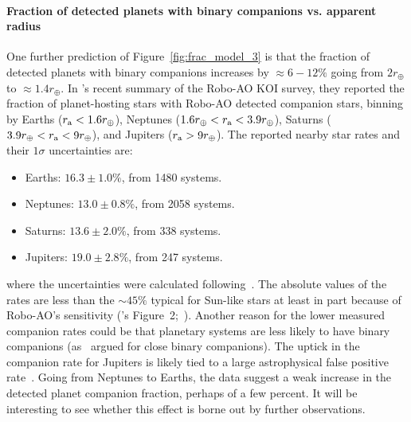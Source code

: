 \documentclass[12pt,modern]{aastex61}
\renewcommand{\a}{_{\rm a}}
\begin{document}
\paragraph{Fraction of detected planets with binary companions vs. apparent 
radius}
One further prediction of Figure~\ref{fig:frac_model_3} is that the
fraction of detected planets with binary companions increases by
$\approx 6-12\%$ going from $2r_\oplus$ to $\approx\! 1.4r_\oplus$.
In \citet{ziegler_robo-ao_2017}'s recent summary of the Robo-AO KOI
survey, they reported the fraction of planet-hosting stars with
Robo-AO detected companion stars, binning by Earths ($r\a <
1.6r_\oplus$), Neptunes ($1.6r_\oplus < r\a < 3.9 r_\oplus$), Saturns
($3.9r_\oplus < r\a < 9 r_\oplus$), and Jupiters ($r\a > 9r_\oplus$).
The reported nearby star rates and their $1\sigma$ uncertainties are:
\begin{itemize}
    \item Earths: $16.3 \pm 1.0\%$, from 1480 systems.
    \item Neptunes: $13.0 \pm 0.8\%$, from 2058 systems.
    \item Saturns: $13.6 \pm 2.0\%$, from 338 systems.
    \item Jupiters: $19.0 \pm 2.8\%$, from 247 systems.
\end{itemize} 
where the uncertainties were calculated
following~\citet{burgasser_binarity_2003}.  The absolute values of the
rates are less than the $\sim\! 45\%$ typical for Sun-like stars at
least in part because of Robo-AO's sensitivity
(\citealt{ziegler_robo-ao_2017}'s
Figure~2;~\citealt{raghavan_survey_2010}).  Another reason for the
lower measured companion rates could be that planetary systems are
less likely to have binary companions (as~\citealt{kraus_impact_2016}
argued for close binary companions).  The uptick in the companion rate
for Jupiters is likely tied to a large astrophysical false positive
rate~\citep{santerne_sophie_2012}.  Going from Neptunes to Earths, the
data suggest a weak increase in the detected planet companion
fraction, perhaps of a few percent.  It will be interesting to see
whether this effect is borne out by further observations.

\end{document}
